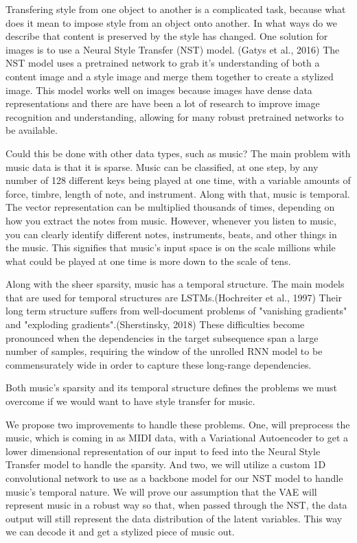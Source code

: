 \documentclass{article}
\begin{document}
Transfering style from one object to another is a complicated task, because what does it mean to impose style from an object onto another. In what ways do we describe that content is preserved by the style has changed. One solution for images is to use a Neural Style Transfer (NST) model. (Gatys et al., 2016) The NST model uses a pretrained network to grab it's understanding of both a content image and a style image and merge them together to create a stylized image. This model works well on images because images have dense data representations and there are have been a lot of research to improve image recognition and understanding, allowing for many robust pretrained networks to be available. 

Could this be done with other data types, such as music? The main problem with music data is that it is sparse. Music can be classified, at one step, by any number of 128 different keys being played at one time, with a variable amounts of force, timbre, length of note, and instrument. Along with that, music is temporal. The vector representation can be multiplied thousands of times, depending on how you extract the notes from music. However, whenever you listen to music, you can clearly identify different notes, instruments, beats, and other things in the music. This signifies that music's input space is on the scale millions while what could be played at one time is more down to the scale of tens.

Along with the sheer sparsity, music has a temporal structure. The main models that are used for temporal structures are LSTMs.(Hochreiter et al., 1997) Their long term structure suffers from well-document problems of "vanishing gradients" and "exploding gradients".(Sherstinsky, 2018)  These difficulties become pronounced when the dependencies in the target subsequence span a large number of samples, requiring the window of the unrolled RNN model to be commensurately wide in order to capture these long-range dependencies.

Both music's sparsity and its temporal structure defines the problems we must overcome if we would want to have style transfer for music.

We propose two improvements to handle these problems. One, will preprocess the music, which is coming in as MIDI data, with a Variational Autoencoder to get a lower dimensional representation of our input to feed into the Neural Style Transfer model to handle the sparsity. And two, we will utilize a custom 1D convolutional network to use as a backbone model for our NST model to handle music's temporal nature. We will prove our assumption that the VAE will represent music in a robust way so that, when passed through the NST, the data output will still represent the data distribution of the latent variables. This way we can decode it and get a stylized piece of music out.
\end{document}
